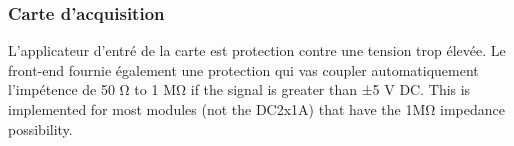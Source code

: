 \subsubsection{Carte d'acquisition}

L'applicateur d'entré de la carte est protection contre une tension trop élevée.
Le front-end fournie également une protection qui vas coupler automatiquement l'impétence de 50 Ω to 1 MΩ if the signal is greater than ±5 V DC. This is implemented for most modules (not the DC2x1A) that have the 1MΩ impedance possibility.
